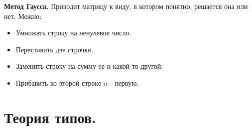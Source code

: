 \documentclass{article}
\begin{document}
	\textbf{Метод Гаусса.} Приводит матрицу к виду, в котором понятно, решается она или нет. Можно:
	\begin{itemize}
		\item Умножать строку на ненулевое число.
		\item Переставить две строчки.
		\item Заменить строку на сумму ее и какой-то другой.
		\item Прибавить ко второй строке $\alpha \cdot$ первую.
	\end{itemize}
	
	
	
	
	
	\newpage
	\section{Теория типов.}
\end{document}
